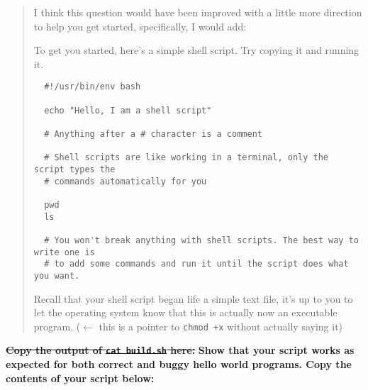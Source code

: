 \documentclass{article}
\begin{document}
\begin{quote}
  \color{red}
  I think this question would have been improved with a little more direction
  to help you get started, specifically, I would add:

  To get you started, here's a simple shell script. Try copying it and running it.
  \begin{lstlisting}
  #!/usr/bin/env bash

  echo "Hello, I am a shell script"

  # Anything after a # character is a comment

  # Shell scripts are like working in a terminal, only the script types the
  # commands automatically for you

  pwd
  ls

  # You won't break anything with shell scripts. The best way to write one is
  # to add some commands and run it until the script does what you want.
  \end{lstlisting}

  Recall that your shell script began life a simple text file, it's up to you
  to let the operating system know that this is actually now an executable
  program. ($\leftarrow$ this is a pointer to \texttt{chmod +x} without
  actually saying it)
\end{quote}

\st{\textbf{Copy the output of \texttt{cat build.sh} here:}}
\textbf{\color{red} Show that your script works as expected for both correct
and buggy hello world programs. Copy the contents of your script below:}
\end{document}

